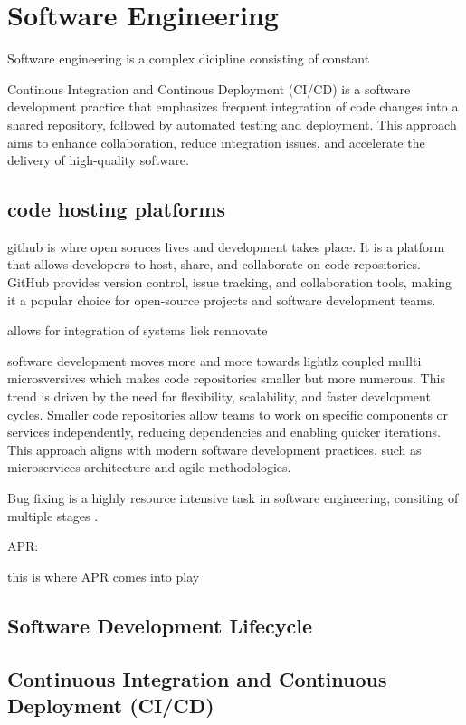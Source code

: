 \section{Software Engineering}
Software engineering is a complex dicipline consisting of constant


Continous Integration and Continous Deployment (CI/CD) is a software development practice that emphasizes frequent integration of code changes into a shared repository, followed by automated testing and deployment. This approach aims to enhance collaboration, reduce integration issues, and accelerate the delivery of high-quality software.


\subsection{code hosting platforms}
github is whre open soruces lives and development takes place. It is a platform that allows developers to host, share, and collaborate on code repositories. GitHub provides version control, issue tracking, and collaboration tools, making it a popular choice for open-source projects and software development teams.

allows for integration of systems liek rennovate


software development moves more and more towards lightlz coupled mullti microsversives which makes code repositories smaller but more numerous. This trend is driven by the need for flexibility, scalability, and faster development cycles. Smaller code repositories allow teams to work on specific components or services independently, reducing dependencies and enabling quicker iterations. This approach aligns with modern software development practices, such as microservices architecture and agile methodologies.


Bug fixing is a highly resource intensive task in software engineering, consiting of multiple stages .

APR:

this is where APR comes into play

\subsection{Software Development Lifecycle}

\subsection{Continuous Integration and Continuous Deployment (CI/CD)}


